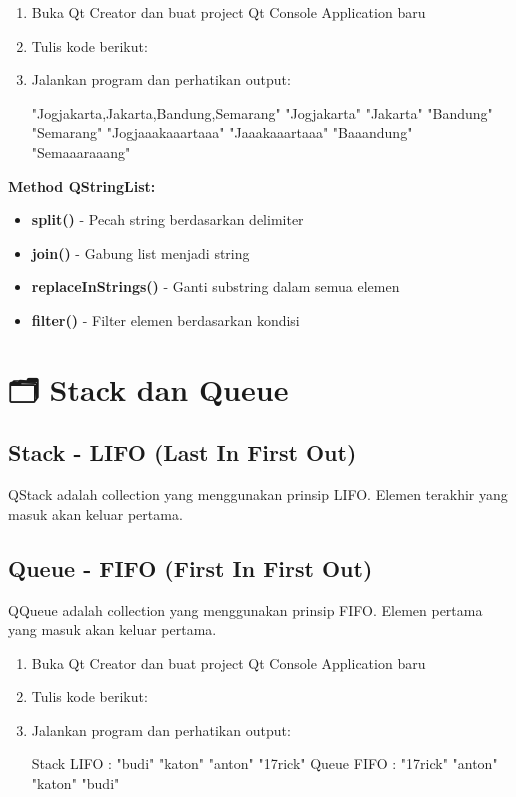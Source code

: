 \begin{enumerate}
\item Buka Qt Creator dan buat project Qt Console Application baru
\item Tulis kode berikut:



\item Jalankan program dan perhatikan output:

\begin{lcverbatim}
"Jogjakarta,Jakarta,Bandung,Semarang"
"Jogjakarta"
"Jakarta"
"Bandung"
"Semarang"
"Jogjaaakaaartaaa"
"Jaaakaaartaaa"
"Baaandung"
"Semaaaraaang"
\end{lcverbatim}
\end{enumerate}

\textbf{Method QStringList:}
\begin{itemize}
\item \textbf{split()} - Pecah string berdasarkan delimiter
\item \textbf{join()} - Gabung list menjadi string
\item \textbf{replaceInStrings()} - Ganti substring dalam semua elemen
\item \textbf{filter()} - Filter elemen berdasarkan kondisi
\end{itemize}

\section{🗂️ Stack dan Queue}

\subsection{Stack - LIFO (Last In First Out)}

QStack adalah collection yang menggunakan prinsip LIFO. Elemen terakhir yang masuk akan keluar pertama.

\subsection{Queue - FIFO (First In First Out)}

QQueue adalah collection yang menggunakan prinsip FIFO. Elemen pertama yang masuk akan keluar pertama.

\begin{enumerate}
\item Buka Qt Creator dan buat project Qt Console Application baru
\item Tulis kode berikut:



\item Jalankan program dan perhatikan output:

\begin{lcverbatim}
Stack LIFO : 
"budi"
"katon"
"anton"
"17rick"
Queue FIFO : 
"17rick"
"anton"
"katon"
"budi"
\end{lcverbatim}
\end{enumerate}

